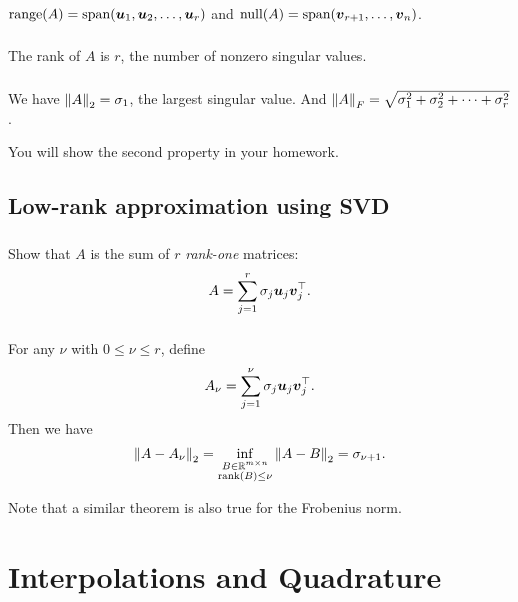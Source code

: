 \documentclass[11pt,letterpaper]{report}
\begin{document}
\subsection{}
$\text{range}(A) = \text{span}(\boldsymbol{u}_1,\boldsymbol{u}_2,\dots,\boldsymbol{u}_r)$ and $\text{null}(A) = \text{span}(\boldsymbol{v}_{r+1},\dots,\boldsymbol{v}_n)$. 

\subsection{}
The rank of $A$ is $r$, the number of nonzero singular values.

\subsection{}
We have $\left\Vert A \right\Vert_2 = \sigma_1$, the largest singular value. And $\left\Vert A \right\Vert_F = \sqrt{\sigma_1^2+\sigma_2^2+\dots+\sigma_r^2}$. 

You will show the second property in your homework.

\section{Low-rank approximation using SVD}
\subsection{}
Show that $A$ is the sum of $r$ \emph{rank-one} matrices:
\begin{align*}
    A = \sum_{j=1}^r \sigma_j \boldsymbol{u}_j \boldsymbol{v}_j^\top.
\end{align*}

\subsection{}
For any $\nu$ with $0\leq \nu \leq r$, define
\begin{align*}
    A_\nu = \sum_{j=1}^\nu \sigma_j \boldsymbol{u}_j \boldsymbol{v}_j^\top.
\end{align*}
Then we have
\begin{align*}
    \left\Vert A-A_\nu \right\Vert_2 = \inf_{\substack{B\in\mathbb{R}^{m\times n}\\\text{rank}(B)\leq\nu}}\left\Vert A-B \right\Vert_2 = \sigma_{\nu+1}.
\end{align*}

Note that a similar theorem is also true for the Frobenius norm.
\chapter{Interpolations and Quadrature}
\end{document}
